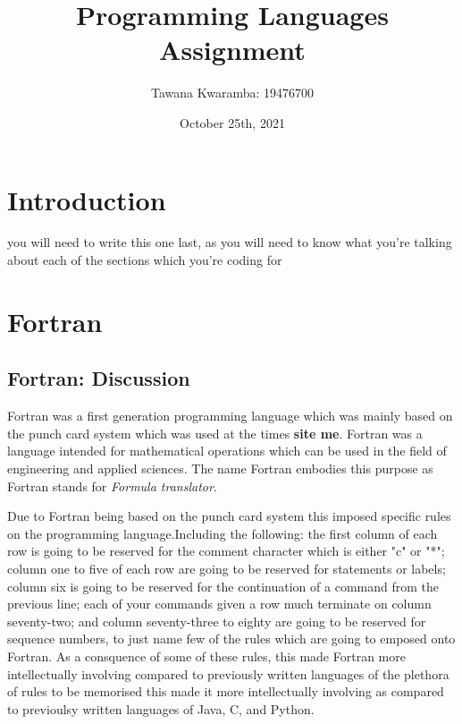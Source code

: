 \documentclass[
	12pt, %
]{fphw}
\title{Programming Languages Assignment} %
\author{Tawana Kwaramba: 19476700} %
\date{October 25th, 2021} %
\institute{Curtin University \\ Faculty of Science and Engineering: School of Electrical Engineering, computing and Math Science} %
\begin{document}
\maketitle
\newpage
\tableofcontents
\newpage
\listoffigures
\listoftables
\newpage

\section{Introduction}
you will need to write this one last, as you will need to know what you're
talking about each of the sections which you're coding for

\section{Fortran}

\subsection{Fortran: Discussion}
Fortran was a first generation programming language which was mainly based on
the punch card system which was used at the times \textbf{site me}.
Fortran was a language intended for mathematical operations which can be used
in the field of engineering and applied sciences. The name Fortran embodies this
purpose as Fortran stands for \emph{Formula translator}.\par

Due to Fortran being based on the punch card system this imposed specific
rules on the programming language.Including the following:
the first column of each row is going to be reserved for
the comment character which is either "c" or "*"; column one to five of each row
are going to be reserved for statements or labels; column six is going to be
reserved for the continuation of a command from the previous line; each of your
commands given a row much terminate on column seventy-two; and column seventy-three
to eighty are going to be reserved for sequence numbers, to just name few of the rules
which are going to emposed onto Fortran. As a consquence of some of these rules,
this made Fortran more intellectually involving compared to previously written
languages
of the plethora of rules
to be memorised this made it more intellectually involving as compared to
previoulsy written languages of Java, C, and Python. \par
\end{document}
